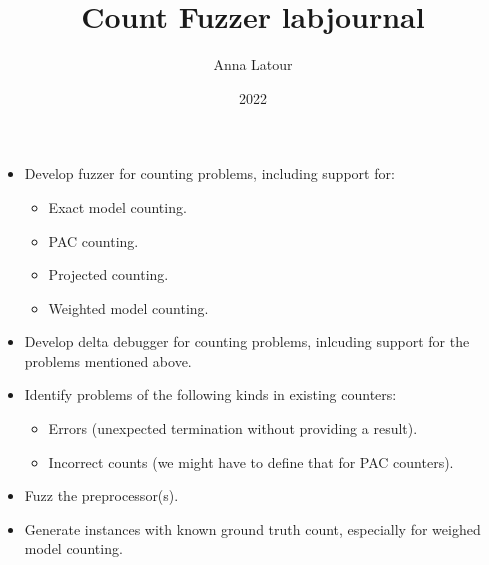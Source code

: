 \documentclass[a4paper]{tufte-handout}
\title{Count Fuzzer labjournal}
\date{2022}
\author{Anna Latour}
\begin{document}
	\maketitle
	
	
	\begin{goals}
		\begin{itemize}
			\item Develop fuzzer for counting problems, including support for:
				\begin{itemize}
					\item Exact model counting.
					\item PAC counting.
					\item Projected counting.
					\item Weighted model counting.
				\end{itemize}
			\item Develop delta debugger for counting problems, inlcuding support for the problems mentioned above.
			\item Identify problems of the following kinds in existing counters:
				\begin{itemize}
					\item Errors (unexpected termination without providing a result).
					\item Incorrect counts (we might have to define that for PAC counters).
				\end{itemize}
			\item Fuzz the preprocessor(s).
			\item Generate instances with known ground truth count, especially for weighed model counting.
		\end{itemize}
	\end{goals}
	
	
\end{document}
